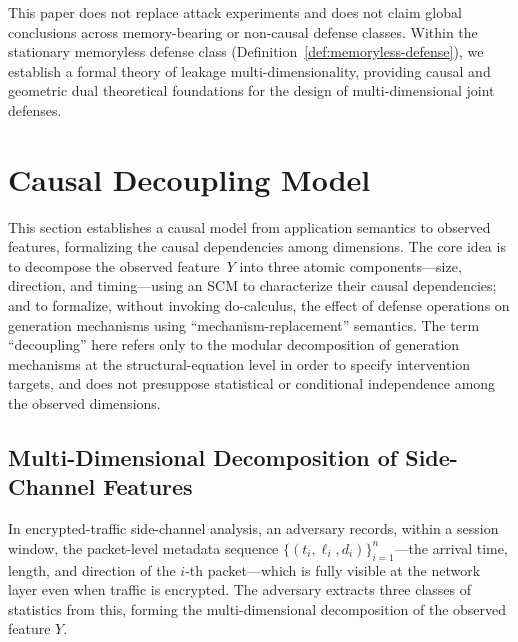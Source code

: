 \documentclass[lettersize,journal]{IEEEtran}
\begin{document}
This paper does not replace attack experiments and does not claim global
conclusions across memory-bearing or non-causal defense classes.
Within the stationary memoryless defense class
(Definition~\ref{def:memoryless-defense}), we establish a formal theory
of leakage multi-dimensionality, providing causal and geometric dual
theoretical foundations for the design of multi-dimensional joint defenses.

\section{Causal Decoupling Model}\label{sec:scm}

This section establishes a causal model from application semantics to
observed features, formalizing the causal dependencies among dimensions.
The core idea is to decompose the observed feature~$Y$ into three atomic
components---size, direction, and timing---using an SCM to characterize
their causal dependencies; and to formalize, without invoking do-calculus,
the effect of defense operations on generation mechanisms using
``mechanism-replacement'' semantics.
The term ``decoupling'' here refers only to the modular decomposition of
generation mechanisms at the structural-equation level in order to specify
intervention targets, and does not presuppose statistical or conditional
independence among the observed dimensions.

\subsection{Multi-Dimensional Decomposition of Side-Channel Features}

In encrypted-traffic side-channel analysis, an adversary records, within a
session window, the packet-level metadata sequence
$\{(t_i,\ell_i,d_i)\}_{i=1}^{n}$---the arrival time, length, and
direction of the $i$-th packet---which is fully visible at the network
layer even when traffic is encrypted.
The adversary extracts three classes of statistics from this, forming the
multi-dimensional decomposition of the observed feature $Y$.
\end{document}
